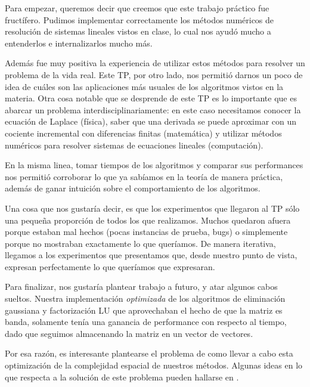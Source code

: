 Para empezar, queremos decir que creemos que este trabajo práctico fue fructífero. Pudimos implementar correctamente los métodos numéricos de resolución de sistemas lineales vistos en clase, lo cual nos ayudó mucho a entenderlos e internalizarlos mucho más.

Además fue muy positiva la experiencia de utilizar estos métodos para resolver un problema de la vida real. Este TP, por otro lado, nos permitió darnos un poco de idea de cuáles son las aplicaciones más usuales de los algoritmos vistos en la materia. Otra cosa notable que se desprende de este TP es lo importante que es abarcar un problema interdisciplinariamente: en este caso necesitamos conocer la ecuación de Laplace (física), saber que una derivada se puede aproximar con un cociente incremental con diferencias finitas (matemática) y utilizar métodos numéricos para resolver sistemas de ecuaciones lineales (computación).

En la misma linea, tomar tiempos de los algoritmos y comparar sus performances nos permitió corroborar lo que ya sabíamos en la teoría de manera práctica, además de ganar intuición sobre el comportamiento de los algoritmos.

Una cosa que nos gustaría decir, es que los experimentos que llegaron al TP sólo una pequeña proporción de todos los que realizamos. Muchos quedaron afuera porque estaban mal hechos (pocas instancias de prueba, bugs) o simplemente porque no mostraban exactamente lo que queríamos. De manera iterativa, llegamos a los experimentos que presentamos que, desde nuestro punto de vista, expresan perfectamente lo que queríamos que expresaran.

Para finalizar, nos gustaría plantear trabajo a futuro, y atar algunos cabos sueltos. Nuestra implementación \emph{optimizada} de los algoritmos de eliminación gaussiana y factorización LU que aprovechaban el hecho de que la matriz es banda, solamente tenía una ganancia de performance con respecto al tiempo, dado que seguimos almacenando la matriz en un vector de vectores.

Por esa razón, es interesante plantearse el problema de como llevar a cabo esta optimización de la complejidad espacial de nuestros métodos. Algunas ideas en lo que respecta a la solución de este problema pueden hallarse en \cite[Cap. 4.3]{golub}. 




